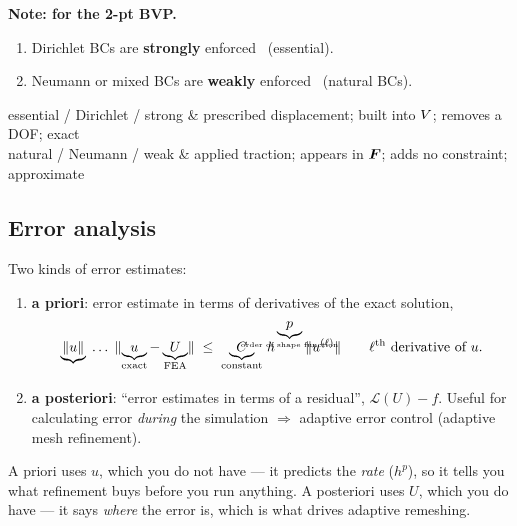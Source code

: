 \medskip
\noindent\textbf{Note: for the 2-pt BVP.}
\begin{enumerate}[label=\textcircled{\scriptsize\arabic*},leftmargin=2.2em,itemsep=2pt]
  \item Dirichlet BCs are \textbf{strongly} enforced \ (essential).
  \item Neumann or mixed BCs are \textbf{weakly} enforced \ (natural BCs).
\end{enumerate}

\begin{dictionary}
essential / Dirichlet / strong & prescribed displacement; built into $V$; removes a DOF; exact\\
natural / Neumann / weak & applied traction; appears in $\bm{F}$; adds no constraint; approximate\\
\end{dictionary}

\subsection*{Error analysis}

Two kinds of error estimates:
\begin{enumerate}[label=\textcircled{\scriptsize\arabic*},leftmargin=2.2em,itemsep=4pt]
  \item \textbf{a priori}: error estimate in terms of derivatives of the exact
        solution, \eg
        \[
          \underbrace{\norm{u}}_{}\;\dots\;
          \norm{\underbrace{u}_{\text{exact}}-\underbrace{U}_{\text{FEA}}}
          \;\le\; \underbrace{C}_{\text{constant}}\,
          h^{\,\underbrace{p}_{\mathclap{\text{order of shape function}}}}\,
          \norm{u^{(\ell)}}
          \qquad \ell^{\text{th}}\text{ derivative of } u .
        \]
  \item \textbf{a posteriori}: ``error estimates in terms of a residual'', \eg
        $\mathcal{L}(U)-f$. Useful for calculating error \emph{during} the
        simulation $\Rightarrow$ adaptive error control (adaptive mesh
        refinement).
\end{enumerate}

\begin{intuition}
A priori uses $u$, which you do not have --- it predicts the \emph{rate}
($h^{p}$), so it tells you what refinement buys before you run anything.
A posteriori uses $U$, which you do have --- it says \emph{where} the error is,
which is what drives adaptive remeshing.
\end{intuition}

